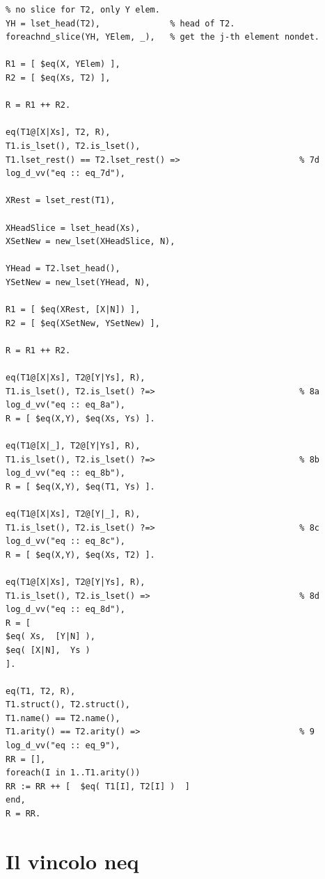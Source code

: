 \documentclass[12pt,a4paper,openright]{book} %
\begin{document}
\begin{verbatim}
% no slice for T2, only Y elem.
YH = lset_head(T2),              % head of T2.
foreachnd_slice(YH, YElem, _),   % get the j-th element nondet.

R1 = [ $eq(X, YElem) ],
R2 = [ $eq(Xs, T2) ],

R = R1 ++ R2.

eq(T1@[X|Xs], T2, R),
T1.is_lset(), T2.is_lset(),
T1.lset_rest() == T2.lset_rest() =>                        % 7d
log_d_vv("eq :: eq_7d"),

XRest = lset_rest(T1),

XHeadSlice = lset_head(Xs),
XSetNew = new_lset(XHeadSlice, N),

YHead = T2.lset_head(),
YSetNew = new_lset(YHead, N),

R1 = [ $eq(XRest, [X|N]) ],
R2 = [ $eq(XSetNew, YSetNew) ],

R = R1 ++ R2.

eq(T1@[X|Xs], T2@[Y|Ys], R),
T1.is_lset(), T2.is_lset() ?=>                             % 8a
log_d_vv("eq :: eq_8a"),
R = [ $eq(X,Y), $eq(Xs, Ys) ].

eq(T1@[X|_], T2@[Y|Ys], R),
T1.is_lset(), T2.is_lset() ?=>                             % 8b
log_d_vv("eq :: eq_8b"),
R = [ $eq(X,Y), $eq(T1, Ys) ].

eq(T1@[X|Xs], T2@[Y|_], R),
T1.is_lset(), T2.is_lset() ?=>                             % 8c
log_d_vv("eq :: eq_8c"),
R = [ $eq(X,Y), $eq(Xs, T2) ].

eq(T1@[X|Xs], T2@[Y|Ys], R),
T1.is_lset(), T2.is_lset() =>                              % 8d
log_d_vv("eq :: eq_8d"),
R = [  
$eq( Xs,  [Y|N] ),  
$eq( [X|N],  Ys ) 
].

eq(T1, T2, R),
T1.struct(), T2.struct(),
T1.name() == T2.name(),
T1.arity() == T2.arity() =>                                % 9
log_d_vv("eq :: eq_9"),
RR = [],
foreach(I in 1..T1.arity())
RR := RR ++ [  $eq( T1[I], T2[I] )  ]
end,
R = RR.
\end{verbatim}

\section{Il vincolo neq}
\end{document}
